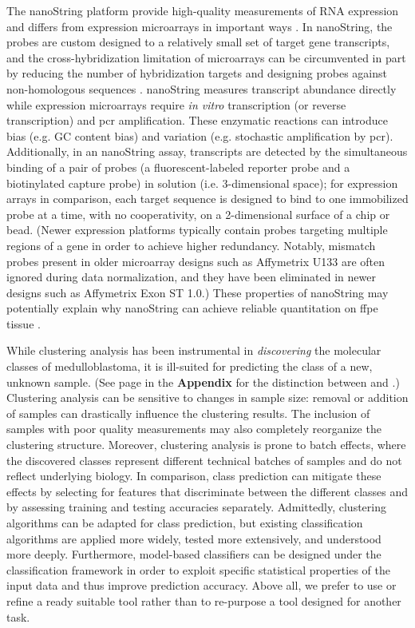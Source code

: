 The nanoString platform provide high-quality measurements of RNA expression and differs from expression microarrays in important ways . In nanoString, the probes are custom designed to a relatively small set of target gene transcripts, and the cross-hybridization limitation of microarrays can be circumvented in part by reducing the number of hybridization targets and designing probes against non-homologous sequences . nanoString measures transcript abundance directly while expression microarrays require \emph{in vitro} transcription (or reverse transcription) and \gls{pcr} amplification. These enzymatic reactions can introduce bias (e.g. GC content bias) and variation (e.g. stochastic amplification by \gls{pcr}). Additionally, in an nanoString assay, transcripts are detected by the simultaneous binding of a pair of probes (a fluorescent-labeled reporter probe and a biotinylated capture probe) in solution (i.e. 3-dimensional space); for expression arrays in comparison, each target sequence is designed to bind to one immobilized probe at a time, with no cooperativity, on a 2-dimensional surface of a chip or bead. (Newer expression platforms typically contain probes targeting multiple regions of a gene in order to achieve higher redundancy. Notably, mismatch probes present in older microarray designs such as Affymetrix U133 are often ignored during data normalization, and they have been eliminated in newer designs such as Affymetrix Exon ST 1.0.) These properties of nanoString may potentially explain why nanoString can achieve reliable quantitation on \gls{ffpe} tissue .

While clustering analysis has been instrumental in \emph{discovering} the molecular classes of medulloblastoma, it is ill-suited for predicting the class of a new, unknown sample. (See page \pageref{sec:classification} in the \textbf{Appendix} for the distinction between  and .)  Clustering analysis can be sensitive to changes in sample size: removal or addition of samples can drastically influence the clustering results. The inclusion of samples with poor quality measurements may also completely reorganize the clustering structure. Moreover, clustering analysis is prone to batch effects, where the discovered classes represent different technical batches of samples and do not reflect underlying biology. In comparison, class prediction can mitigate these effects by selecting for features that discriminate between the different classes and by assessing training and testing accuracies separately. Admittedly, clustering algorithms can be adapted for class prediction, but existing classification algorithms are applied more widely, tested more extensively, and understood more deeply. Furthermore, model-based classifiers can be designed under the classification framework in order to exploit specific statistical properties of the input data and thus improve prediction accuracy. Above all, we prefer to use or refine a ready suitable tool rather than to re-purpose a tool designed for another task.

